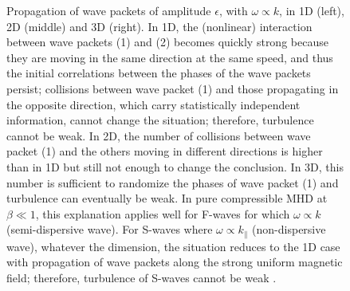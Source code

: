 \documentclass{jpp}
\newcommand{\red}[1]{}
\begin{document}
\begin{figure}
\caption{Propagation of wave packets of amplitude $\epsilon$, with $\omega \propto k$, in 1D (left), 2D (middle) and 3D (right). In 1D, the (nonlinear) interaction between wave packets (1) and (2) becomes quickly strong because they are moving in the same direction at the same speed, and thus the initial correlations between the phases of the wave packets persist; collisions between wave packet (1) and those propagating in the opposite direction, which carry statistically independent information, cannot change the situation; therefore, turbulence cannot be weak. In 2D, the number of collisions between wave packet (1) and the others moving in different directions is higher than in 1D but still not enough to change the conclusion. In 3D, this number is sufficient to randomize the phases of wave packet (1) and turbulence can eventually be weak. In pure compressible MHD at $\beta \ll 1$, this explanation applies well for F-waves for which $\omega \propto k$ (semi-dispersive wave). For S-waves where $\omega \propto k_\parallel$ (non-dispersive wave), whatever the dimension, the situation reduces to the 1D case with propagation of wave packets along the strong uniform magnetic field; therefore, turbulence of S-waves cannot be weak \red{and can produce shocks}.}
\label{Fig1}
\end{figure}
\end{document}
